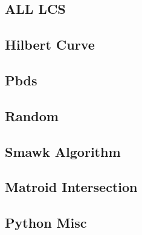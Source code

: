 \subsection{ALL LCS}

\subsection{Hilbert Curve}

\subsection{Pbds}

\subsection{Random}

\subsection{Smawk Algorithm}

% 
\subsection{Matroid Intersection}

\subsection{Python Misc}
